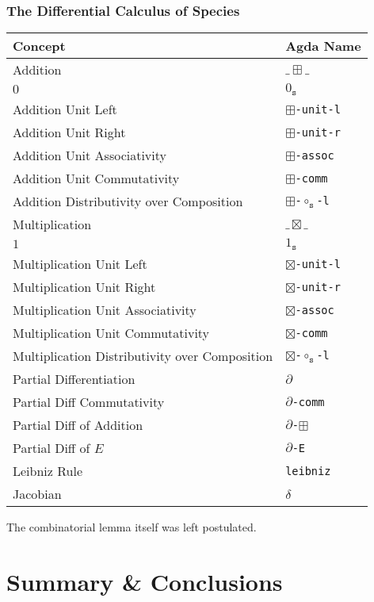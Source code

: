 \documentclass[12pt, parskip, DIV=14]{scrbook}
\renewcommand{\circ}{\vysmwhtcircle}
\begin{document}
\subsection{The Differential Calculus of Species}

\begin{center}
\begin{tabular}{ll}
  Concept & Agda Name \\
  \hline
  Addition & $\_\boxplus\_$ \\
  $0$ & $0_\texttt{s}$ \\
  Addition Unit Left & \texttt{$\boxplus$-unit-l} \\
  Addition Unit Right & \texttt{$\boxplus$-unit-r} \\
  Addition Unit Associativity & \texttt{$\boxplus$-assoc} \\
  Addition Unit Commutativity & \texttt{$\boxplus$-comm} \\
  Addition Distributivity over Composition & \texttt{$\boxplus$-$\circ_\texttt{s}$-l} \\
  Multiplication & $\_\boxtimes\_$ \\
  $1$ & $1_\texttt{s}$ \\
  Multiplication Unit Left & \texttt{$\boxtimes$-unit-l} \\
  Multiplication Unit Right & \texttt{$\boxtimes$-unit-r} \\
  Multiplication Unit Associativity & \texttt{$\boxtimes$-assoc} \\
  Multiplication Unit Commutativity & \texttt{$\boxtimes$-comm} \\
  Multiplication Distributivity over Composition & \texttt{$\boxtimes$-$\circ_\texttt{s}$-l} \\
  Partial Differentiation & $\partial$ \\
  Partial Diff Commutativity & \texttt{$\partial$-comm} \\
  Partial Diff of Addition & \texttt{$\partial$-$\boxplus$} \\
  Partial Diff of $E$ & \texttt{$\partial$-E} \\
  Leibniz Rule & \texttt{leibniz} \\
  Jacobian & $\delta$ \\
\end{tabular}
\end{center}

The combinatorial lemma itself was left postulated.

\chapter{Summary \& Conclusions}




\newpage


\end{document}
